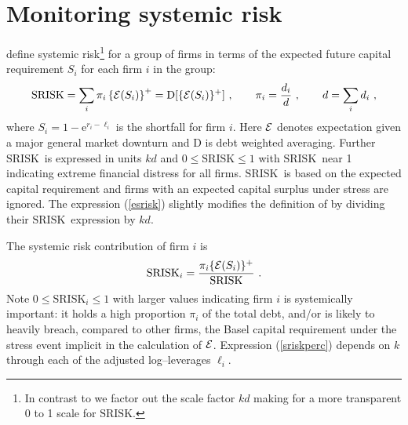 \documentclass[authoryear]{elsarticle}
\newcommand{\e}{\mathrm{e}}
\newcommand{\Ex}{{\cal E}}
\newcommand{\Es}{\Ex}
\newcommand{\sr}{\ensuremath{\mathrm{SRISK}}}
\newcommand{\eref}[1]{(\ref{#1})}
\newcommand{\cq}{\ , \qquad}
\newcommand{\be}[1]{\begin{equation}\label{#1}}
\newcommand{\ee}{\end{equation}}
\newcommand{\D}{\mathrm{D}}
\begin{document}
\section*{Monitoring systemic risk}\label{srisk}

 \cite{brownlees2015} define  systemic risk\footnote{In contrast to \cite{brownlees2015} we factor out the scale factor $kd$ making for a more transparent 0 to 1 scale for \sr.} for a group of firms in terms of the expected future capital requirement $S_i$ for each firm $i$ in the group:
\be{esrisk}
\sr =  \sum_i \pi_i\left\{\Es(S_i)\right\}^+ = \D[\{\Ex(S_i)\}^+]\cq \pi_i = \frac{d_i}{d}\cq d=\sum_id_i \ ,
\ee
where $S_i=1-\e^{r_i-\ell_i}$ is the shortfall  for firm $i$.
Here $\Es$ denotes expectation given a major general market downturn and $\D$ is debt weighted averaging.    Further \sr\ is expressed in units $kd$ and $0\le\sr\le 1$ with \sr\ near 1 indicating extreme financial distress for all firms. \sr\ is based on the expected capital requirement and firms with an expected capital surplus under stress are ignored.   The expression \eref{esrisk} slightly modifies the definition  of \cite{brownlees2015} by dividing their \sr\ expression by $kd$. 

The systemic risk contribution of firm $i$  is  \citep{brownlees2015} 
\be{sriskperc}
\sr_i=\frac{\pi_i\{\Ex(S_i)\}^+}{\sr} \ .
 \ee
 Note $0\le \sr_i\le 1$ with larger values indicating firm $i$ is systemically important: it holds a high proportion $\pi_i$ of the total debt, and/or is likely to heavily breach, compared to other firms, the Basel capital requirement under the stress event implicit in the calculation of $\Ex$.  Expression \eref{sriskperc} depends on $k$ through each of the adjusted log--leverages $\ell_i$. 
\end{document}
